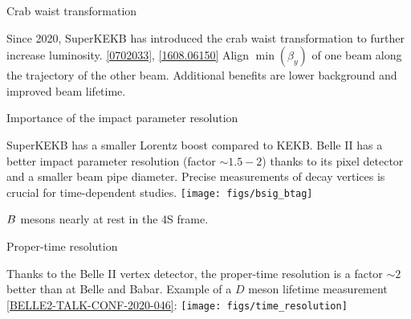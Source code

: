 \begin{frame}{Crab waist transformation}
\bi
\item Since 2020, SuperKEKB has introduced the crab waist transformation to further increase luminosity. {\small \href{https://arxiv.org/abs/physics/0702033}{\color{blue!40!gray} [0702033]}, \href{https://arxiv.org/abs/1608.06150}{\color{blue!40!gray} [1608.06150]}}
\bi
\itemi Align $\min(\beta_y)$ of one beam along the trajectory of the other beam.
\itemi Additional benefits are lower background and improved beam lifetime.
\ei
\ei
\centering
{}
\end{frame}
\begin{frame}{Importance of the impact parameter resolution}
\bi
\item SuperKEKB has a smaller Lorentz boost compared to KEKB.
\itemiii Belle II has a better impact parameter resolution (factor $\sim1.5-2$) thanks to its pixel detector and a smaller beam pipe diameter.
\bi
{}
\itemiii Precise measurements of decay vertices is crucial for time-dependent studies.
\ei
\ei
\centering
\texttt{[image: figs/bsig\_btag]}
\bi
\item $B$ mesons nearly at rest in the \Y4S frame. 
\bi
{}
\ei
\ei
\end{frame}
\begin{frame}{Proper-time resolution}
\bi
\item Thanks to the Belle II vertex detector, the proper-time resolution is a factor $\sim2$ better than at Belle and Babar.
\itemii Example of a $D$ meson lifetime measurement {\tiny \href{https://docs.belle2.org/record/2074?ln=en}{\color{blue!40!gray} [BELLE2-TALK-CONF-2020-046]}}:
\ei
\vspace{0.5cm}
\centering
\texttt{[image: figs/time\_resolution]} 
\end{frame}
